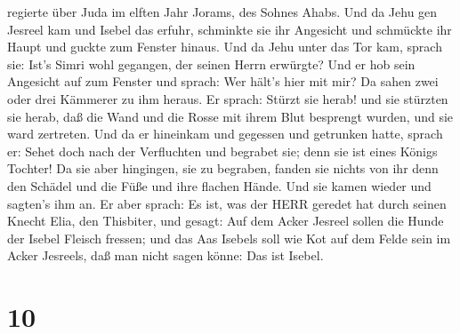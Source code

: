 regierte über Juda im elften Jahr Jorams, des Sohnes Ahabs.
 Und da Jehu gen Jesreel kam und Isebel das erfuhr,
schminkte sie ihr Angesicht und schmückte ihr Haupt und guckte zum
Fenster hinaus.  Und da Jehu unter das Tor kam, sprach sie:
Ist's Simri wohl gegangen, der seinen Herrn erwürgte?  Und
er hob sein Angesicht auf zum Fenster und sprach: Wer hält's hier mit
mir? Da sahen zwei oder drei Kämmerer zu ihm heraus.  Er
sprach: Stürzt sie herab! und sie stürzten sie herab, daß die Wand und
die Rosse mit ihrem Blut besprengt wurden, und sie ward zertreten.
 Und da er hineinkam und gegessen und getrunken hatte,
sprach er: Sehet doch nach der Verfluchten und begrabet sie; denn sie
ist eines Königs Tochter!  Da sie aber hingingen, sie zu
begraben, fanden sie nichts von ihr denn den Schädel und die Füße und
ihre flachen Hände.  Und sie kamen wieder und sagten's ihm
an. Er aber sprach: Es ist, was der HERR geredet hat durch seinen Knecht
Elia, den Thisbiter, und gesagt: Auf dem Acker Jesreel sollen die Hunde
der Isebel Fleisch fressen;  und das Aas Isebels soll wie
Kot auf dem Felde sein im Acker Jesreels, daß man nicht sagen könne: Das
ist Isebel.

\hypertarget{section-9}{%
\section{10}\label{section-9}}


